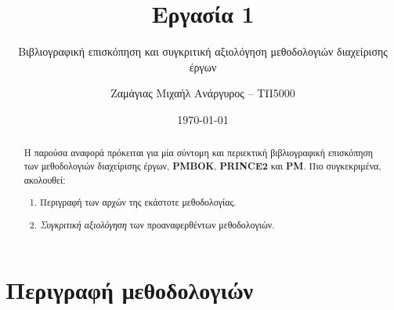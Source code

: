 \documentclass[12pt]{turabian-researchpaper}
\title{Εργασία 1}
\subtitle{Βιβλιογραφική επισκόπηση και συγκριτική αξιολόγηση μεθοδολογιών διαχείρισης έργων}
\author{Ζαμάγιας Μιχαήλ Ανάργυρος -- ΤΠ5000}
\date{\today}
\begin{document}
\begin{titlepage}
    \maketitle
\end{titlepage}

\begin{abstract}
    Η παρούσα αναφορά πρόκειται για μία σύντομη και περιεκτική βιβλιογραφική επισκόπηση των μεθοδολογιών διαχείρισης έργων, \textbf{PMBOK},
    \textbf{PRINCE2} και \textbf{PM}.
    Πιο συγκεκριμένα, ακολουθεί:
    \begin{enumerate}
        \item Περιγραφή των αρχών της εκάστοτε μεθοδολογίας.
        \item \textit{Συγκριτική αξιολόγηση} των προαναφερθέντων μεθοδολογιών.
    \end{enumerate}
\end{abstract}

\tableofcontents

\newpage

\section{Περιγραφή μεθοδολογιών}\label{methods}
\end{document}
